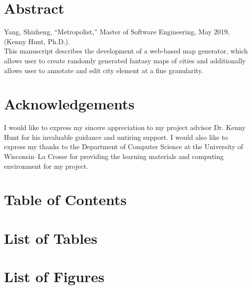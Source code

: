 \documentclass[letterpaper,12pt]{report}
\begin{document}
\hypersetup{pageanchor=false}

\clearpage


\clearpage

\hypersetup{pageanchor=true}
\setcounter{page}{1}
\renewcommand\arraystretch{1.5}

\section*{Abstract}
Yang, Shizheng, ``Metropolist,'' Master of Software Engineering, May 2019, (Kenny Hunt, Ph.D.). \\

This manuscript describes the development of a web-based map generator, which allows user to create randomly generated fantasy maps of cities and additionally allows user to annotate and edit city element at a fine granularity.
\clearpage

\section*{Acknowledgements}
I would like to express my sincere appreciation to my project advisor Dr. Kenny Hunt for his invaluable guidance and untiring support. I would also like to express my thanks to the Department of Computer Science at the University of Wisconsin--La Crosse for providing the learning materials and computing environment for my project.
\clearpage

\section*{Table of Contents}
\tableofcontents
\clearpage

\section*{List of Tables}
\listoftables
\clearpage

\section*{List of Figures}
\listoffigures
\clearpage

\end{document}
